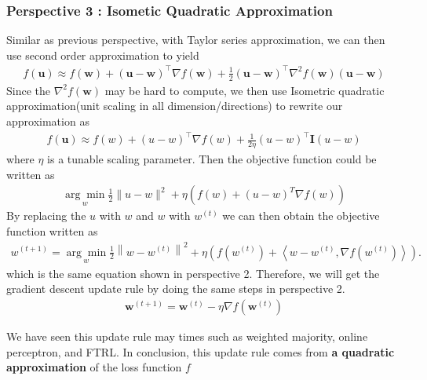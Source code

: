 \documentclass[11pt]{article}
\begin{document}
\subsubsection{Perspective 3 : Isometic Quadratic Approximation}
Similar as previous perspective, with Taylor series approximation, we can then use second order approximation to yield
\begin{align}
    f(\boldsymbol{u}) \approx f(\boldsymbol{w})+(\boldsymbol{u}-\boldsymbol{w})^{\top} \nabla f(\boldsymbol{w})+\frac{1}{2}(\boldsymbol{u}-\boldsymbol{w})^{\top} \nabla^{2} f(\boldsymbol{w})(\boldsymbol{u}-\boldsymbol{w})
\end{align}
Since the $\nabla^{2} f(\boldsymbol{w})$ may be hard to compute, we then use Isometric quadratic approximation(unit scaling in all dimension/directions) to rewrite our approximation as 
\begin{align}
    f(\boldsymbol{u}) \approx f(w)+(u-w)^{\top} \nabla f(w)+\frac{1}{2 \eta}(u-w)^{\top} \mathbf{I}(u-w)
\end{align}
where $\eta$ is a tunable scaling parameter. Then the objective function could be written as 
\begin{align}
    \underset{w}{\arg \min } \frac{1}{2}\|u-w\|^{2}+\eta\left(f(w)+(u-w)^{T} \nabla f(w)\right)
\end{align}
By replacing the $u$ with $w$ and $w$ with $w^{(t)}$ we can then obtain the objective function written as 
\begin{align}
    w^{(t+1)}=\underset{w}{\arg \min } \frac{1}{2}\left\|w-w^{(t)}\right\|^{2}+\eta\left(f\left(w^{(t)}\right)+\left\langle w-w^{(t)}, \nabla f\left(w^{(t)}\right) \right\rangle \right).
\end{align}
which is the same equation shown in perspective 2. Therefore, we will get the gradient descent update rule by doing the same steps in perspective 2. 
\begin{align}
\mathbf{w}^{(t+1)}=\mathbf{w}^{(t)}-\eta \nabla f\left(\mathbf{w}^{(t)}\right)
\end{align}

We have seen this update rule may times such as weighted majority, online perceptron, and FTRL.
In conclusion, this update rule comes from \textbf{a quadratic approximation} of the loss function $f$
\end{document}
